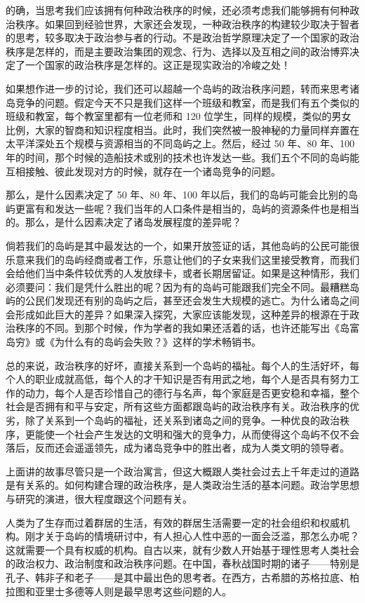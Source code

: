 的确，当思考我们应该拥有何种政治秩序的时候，还必须考虑我们能够拥有何种政治秩序。如果回到经验世界，大家还会发现，一种政治秩序的构建较少取决于智者的思考，较多取决于政治参与者的行动。不是政治哲学原理决定了一个国家的政治秩序是怎样的，而是主要政治集团的观念、行为、选择以及互相之间的政治博弈决定了一个国家的政治秩序是怎样的。这正是现实政治的冷峻之处！

如果想作进一步的讨论，我们还可以超越一个岛屿的政治秩序问题，转而来思考诸岛竞争的问题。假定今天不只是我们这样一个班级和教室，而是我们有五个类似的班级和教室，每个教室里都有一位老师和 120 位学生，同样的规模，类似的男女比例，大家的智商和知识程度相当。此时，我们突然被一股神秘的力量同样弃置在太平洋深处五个规模与资源相当的不同岛屿之上。然后，经过 50 年、80 年、100 年的时间，那个时候的造船技术或别的技术也许发达一些。我们五个不同的岛屿能互相接触、彼此发现对方的时候，就存在一个诸岛竞争的问题。

那么，是什么因素决定了 50 年、80 年、100 年以后，我们的岛屿可能会比别的岛屿更富有和发达一些呢？我们当年的人口条件是相当的，岛屿的资源条件也是相当的。那么，是什么因素决定了诸岛发展程度的差异呢？

倘若我们的岛屿是其中最发达的一个，如果开放签证的话，其他岛屿的公民可能很乐意来我们的岛屿经商或者工作，乐意让他们的子女来我们这里接受教育，而我们会给他们当中条件较优秀的人发放绿卡，或者长期居留证。如果是这种情形，我们必须要问：我们是凭什么胜出的呢？因为有的岛屿可能跟我们完全不同。最糟糕岛屿的公民们发现还有别的岛屿之后，甚至还会发生大规模的逃亡。为什么诸岛之间会形成如此巨大的差异？如果深入探究，大家应该能发现，这种差异的根源在于政治秩序的不同。到那个时候，作为学者的我如果还活着的话，也许还能写出《岛富岛穷》或《为什么有的岛屿会失败？》这样的学术畅销书。

总的来说，政治秩序的好坏，直接关系到一个岛屿的福祉。每个人的生活好坏，每个人的职业成就高低，每个人的才干知识是否有用武之地，每个人是否具有努力工作的动力，每个人是否珍惜自己的德行与名声，每个家庭是否更安稳和幸福，整个社会是否拥有和平与安定，所有这些方面都跟岛屿的政治秩序有关。政治秩序的优劣，除了关系到一个岛屿的福祉，还关系到诸岛之间的竞争。一种优良的政治秩序，更能使一个社会产生发达的文明和强大的竞争力，从而使得这个岛屿不仅不会落后，反而还会遥遥领先，成为诸岛竞争中的胜出者，成为人类文明的领导者。

上面讲的故事尽管只是一个政治寓言，但这大概跟人类社会过去上千年走过的道路是有关系的。如何构建合理的政治秩序，是人类政治生活的基本问题。政治学思想与研究的演进，很大程度跟这个问题有关。


人类为了生存而过着群居的生活，有效的群居生活需要一定的社会组织和权威机构。刚才关于岛屿的情境研讨中，有人担心人性中恶的一面会泛滥，那怎么办呢？这就需要一个具有权威的机构。自古以来，就有少数人开始基于理性思考人类社会的政治权力、政治制度和政治秩序问题。在中国，春秋战国时期的诸子——特别是孔子、韩非子和老子——是其中最出色的思考者。在西方，古希腊的苏格拉底、柏拉图和亚里士多德等人则是最早思考这些问题的人。

